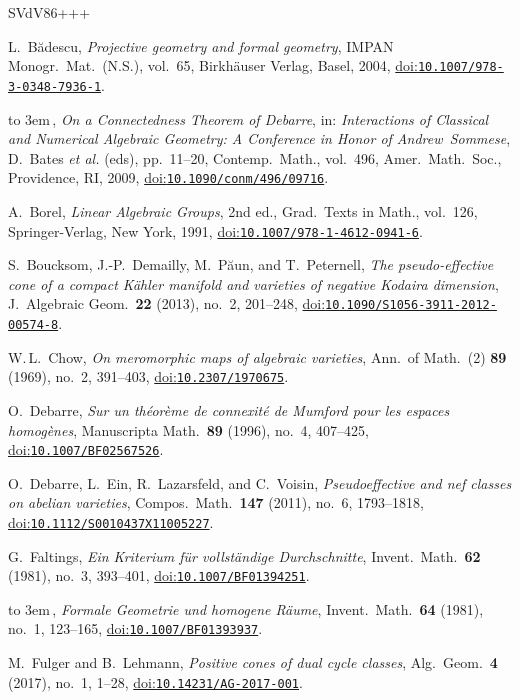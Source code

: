 \documentclass[10pt,a4paper]{article}
\numberwithin{equation}{section}
\theoremstyle{definition}
\theoremstyle{remark}
\providecommand\doi[1]{\href{https://doi.org/#1}{doi:\nolinkurl{#1}}}
\providecommand\bysame{\leavevmode\hbox to 3em{\hrulefill}\,}
\begin{document}
\newcommand{\etalchar}[1]{$^{#1}$}
\begin{thebibliography}{SVdV86+++}

L.~B\u{a}descu, \emph{Projective geometry and formal geometry}, IMPAN Monogr.\ Mat.\ (N.S.), vol.~65, Birkh\"auser Verlag, Basel, 2004, \doi{10.1007/978-3-0348-7936-1}.

\bysame,  \emph{On a Connectedness Theorem of Debarre}, in: \emph{Interactions of Classical and Numerical Algebraic Geometry: A Conference in Honor of Andrew~Sommese}, D.~Bates \emph{et al.} (eds), pp.~11--20, Contemp.\ Math., vol.~496, Amer.\ Math.\ Soc., Providence, RI, 2009, \doi{10.1090/conm/496/09716}.

A.~Borel, \emph{Linear Algebraic Groups}, 2nd ed., Grad.\  Texts in Math., vol.~126, Springer-Verlag, New York, 1991, \doi{10.1007/978-1-4612-0941-6}.

\bibitem[BDP\etalchar{+}13]{bdpp}
S.~Boucksom, J.-P.~Demailly, M.~P\u{a}un, and T.~Peternell, \emph{The pseudo-effective cone of a compact K\"ahler manifold and varieties of negative Kodaira dimension}, J.~Algebraic Geom.\ \textbf{22} (2013), no.~2, 201--248, \doi{10.1090/S1056-3911-2012-00574-8}.

W.\,L.~Chow, \emph{On meromorphic maps of algebraic varieties}, Ann.\ of Math.~(2) \textbf{89} (1969), no.~2, 391--403, \doi{10.2307/1970675}.

O.~Debarre,  \emph{Sur un th\'eor\`eme de connexit\'e de Mumford pour les espaces homog\`enes}, Manuscripta Math.\ \textbf{89} (1996), no.~4, 407--425, \doi{10.1007/BF02567526}.

\bibitem[DEL\etalchar{+}11]{delv}
 O.~Debarre, L.~Ein, R.~Lazarsfeld, and C.~Voisin, \emph{Pseudoeffective and nef classes on abelian varieties}, Compos.\ Math.\ \textbf{147} (2011), no.~6, 1793--1818, \doi{10.1112/S0010437X11005227}.

G.~Faltings, \emph{Ein Kriterium f\"ur vollst\"andige Durchschnitte}, Invent.\ Math.\ \textbf{62} (1981),  no.~3, 393--401, \doi{10.1007/BF01394251}.

  \bysame,  \emph{Formale Geometrie und homogene R\"aume}, Invent.\ Math.\ \textbf{64} (1981), no.~1, 123--165, \doi{10.1007/BF01393937}.

M.~Fulger and B.~Lehmann,  \emph{Positive cones of dual cycle classes}, Alg.\ Geom.\ \textbf{4} (2017), no.~1, 1--28, \doi{10.14231/AG-2017-001}.


\end{thebibliography}
\end{document}
